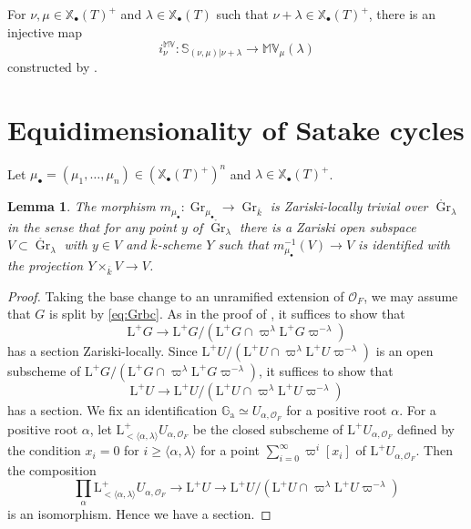 \documentclass[12pt,a4paper]{article}
\newtheorem{lem}[thm]{Lemma}
\DeclareMathOperator{\Gr}{Gr}
\newcommand{\bS}{\mathbb{S}}
\newcommand{\bX}{\mathbb{X}}
\newcommand{\cO}{\mathcal{O}}
\newcommand{\rL}{\mathrm{L}}
\newcommand{\ol}{\overline}
\newcommand{\bMV}{\mathbb{MV}}
\newcommand{\Ga}{\mathbb{G}_{\mathrm{a}}}
\begin{document}
For $\nu, \mu \in \bX_{\bullet}(T)^+$ and 
$\lambda \in \bX_{\bullet}(T)$ such that 
$\nu+\lambda \in \bX_{\bullet}(T)^+$, 
there is an injective map 
\begin{equation*}
 i_{\nu}^{\bMV} \colon \bS_{(\nu,\mu)|\nu+\lambda} \to 
 \bMV_{\mu} (\lambda) 
\end{equation*}
constructed by \cite[Lemma 3.2.7]{XiZhCycSh}. 

\section{Equidimensionality of Satake cycles}\label{sec:EqScyc}
Let $\mu_{\bullet} =(\mu_1, \ldots, \mu_n) \in (\bX_{\bullet}(T)^+)^n$ and $\lambda \in \bX_{\bullet}(T)^+$. 
\begin{lem}\label{lem:Ztri}
The morphism 
$m_{\mu_{\bullet}} \colon \Gr_{\mu_{\bullet}} \to \Gr_{\ol{k}}$ 
is Zariski-locally trivial over $\mathring{\Gr}_{\lambda}$ in the sense that for any point $y$ of $\mathring{\Gr}_{\lambda}$ there is a Zariski open subspace $V \subset \mathring{\Gr}_{\lambda}$ with $y \in V$ and $\overline{k}$-scheme $Y$ such that $m_{\mu_{\bullet}}^{-1}(V) \to V$ is identified with the projection $Y \times_{\overline{k}} V \to V$. 
\end{lem}
\begin{proof}
Taking the base change to 
an unramified extension of $\cO_F$, 
we may assume that $G$ is split by \eqref{eq:Grbc}. 
As in the proof of \cite[Lemma 2.1]{HaiEquconv}, 
it suffices to show that 
\[
 \rL^+G \to \rL^+G/(\rL^+G \cap \varpi^{\lambda} \rL^+G \varpi^{-\lambda}) 
\]
has a section Zariski-locally. 
Since 
$\rL^+U/(\rL^+U \cap \varpi^{\lambda} \rL^+U \varpi^{-\lambda})$ 
is an open subscheme of 
$\rL^+G/(\rL^+G \cap \varpi^{\lambda} \rL^+G \varpi^{-\lambda})$, 
it suffices to show that 
\[
 \rL^+U \to \rL^+U/(\rL^+U \cap \varpi^{\lambda} \rL^+U \varpi^{-\lambda}) 
\]
has a section. 
We fix an identification $\Ga \simeq U_{\alpha,\cO_F}$ 
for a positive root $\alpha$. 
For a positive root $\alpha$, 
let 
$\rL^+_{< \langle \alpha, \lambda \rangle} U_{\alpha,\cO_F}$ 
be the closed subscheme of $\rL^+U_{\alpha,\cO_F}$ 
defined by the condition 
$x_i=0$ for $i \geq \langle \alpha, \lambda \rangle$ 
for a point 
$\sum_{i=0}^{\infty} \varpi^i [x_i]$ of 
$\rL^+U_{\alpha,\cO_F}$. 
Then the composition 
\[
 \prod_{\alpha} \rL^+_{< \langle \alpha, \lambda \rangle} U_{\alpha,\cO_F} \to \rL^+ U \to \rL^+U/(\rL^+U \cap \varpi^{\lambda} \rL^+U \varpi^{-\lambda}) 
\]
is an isomorphism. Hence we have a section. 
\end{proof}
\end{document}

